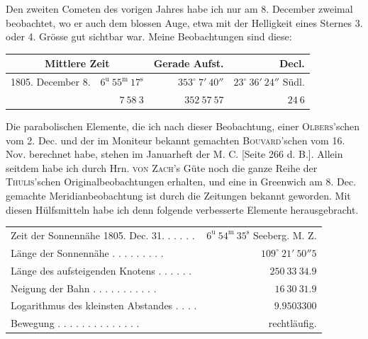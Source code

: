 \par\indent Den zweiten Cometen des vorigen Jahres habe ich nur am 8. December zweimal beobachtet, wo er auch dem blossen Auge, etwa mit der Helligkeit eines Sternes 3. oder 4. Grösse gut sichtbar war. Meine Beobachtungen sind diese:
\begin{center}
\begingroup\fontsize{9}{11}\selectfont\setlength{\tabcolsep}{2pt}\renewcommand{\arraystretch}{1.1}
\begin{tabular}{lr|r|r}
\multicolumn{2}{c|}{Mittlere Zeit} & Gerade Aufst. & Decl.\\ \hline
1805. December 8. & $6^{\mathrm u}\ 55^{\mathrm m}\ 17^{\mathrm s}$ & $353^\circ\ 7'\ 40''$ & $23^\circ\ 36'\ 24''$ Südl.\\
& $7\ 58\ 3$ & $352\ 57\ 57$ & $24\ 6$\\
\end{tabular}\endgroup
\end{center}

\par\indent Die parabolischen Elemente, die ich nach dieser Beobachtung, einer \textsc{Olbers}'schen vom 2. Dec. und der im Moniteur bekannt gemachten \textsc{Bouvard}'schen vom 16. Nov. berechnet habe, stehen im Januarheft der M. C. [Seite 266 d. B.]. Allein seitdem habe ich durch Hrn. \textsc{von Zach}'s Güte noch die ganze Reihe der \textsc{Thulis}'schen Originalbeobachtungen erhalten, und eine in Greenwich am 8. Dec. gemachte Meridianbeobachtung ist durch die Zeitungen bekannt geworden. Mit diesen Hülfsmitteln habe ich denn folgende verbesserte Elemente herausgebracht.

\begin{center}
\begingroup\fontsize{8}{10}\selectfont\setlength{\tabcolsep}{2pt}\renewcommand{\arraystretch}{1.1}
\begin{tabular}{lr}
Zeit der Sonnennähe 1805. Dec. 31. . . . . . & $6^{\mathrm u}\ 54^{\mathrm m}\ 35^{\mathrm s}$ Seeberg. M. Z.\\
Länge der Sonnennähe . . . . . . . . . & $109^\circ\ 21'\ 50''5$\\
Länge des aufsteigenden Knotens . . . . . . & $250\ 33\ 34.9$\\
Neigung der Bahn . . . . . . . . . . . & $16\ 30\ 31.9$\\
Logarithmus des kleinsten Abstandes . . . . & $9.9503300$\\
Bewegung . . . . . . . . . . . . . . & rechtläufig.\\
\end{tabular}\endgroup
\end{center}

